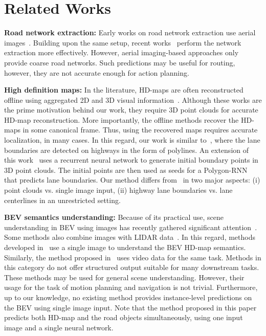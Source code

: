 \documentclass[10pt,twocolumn,letterpaper]{article}
\begin{document}
\section{Related Works}

\noindent\textbf{Road network extraction:} Early works on road network extraction use aerial images~\cite{auclair1999survey, richards1999remote}. Building upon the same setup, recent works~\cite{batra2019improved,sun2019leveraging,ventura2018iterative} perform the network extraction more effectively. However, aerial imaging-based approaches only provide coarse road networks. Such predictions may be useful for routing, however, they are not accurate enough for action planning. 

\noindent\textbf{High definition maps:} In the literature, HD-maps are often reconstructed offline using aggregated 2D and 3D visual information~\cite{liang2019convolutional, homayounfar2018hierarchical,liang2018end}. Although these works are the prime motivation behind our work, they require 3D point clouds for accurate HD-map reconstruction. More importantly, the offline methods recover the HD-maps in some canonical frame. Thus, using the recovered maps requires accurate localization, in many cases. In this regard, our work is similar to~\cite{DBLP:conf/cvpr/HomayounfarMLU18}, where the lane boundaries are detected on highways in the form of polylines. An extension of this work~\cite{DBLP:conf/cvpr/HomayounfarMLU18} uses a recurrent neural network to generate initial boundary points in 3D point clouds. The initial points are then used as seeds for a Polygon-RNN~\cite{DBLP:conf/cvpr/AcunaLKF18} that predicts lane boundaries. Our method differs from~\cite{DBLP:conf/cvpr/HomayounfarMLU18} in two major aspects: (i) point clouds vs. single image input, (ii) highway lane boundaries vs. lane centerlines in an unrestricted setting.

\noindent\textbf{BEV semantics understanding:}
Because of its practical use, scene understanding in BEV using images has recently gathered significant attention~\cite{DBLP:conf/cvpr/RoddickC20,philion2020lift,can2020understanding}. Some methods also combine images with LIDAR data~\cite{pan2020cross,hendy2020fishing}. In this regard, methods developed in~\cite{DBLP:conf/cvpr/RoddickC20,DBLP:journals/corr/abs-2002-08394} use a single image to understand the BEV HD-map semantics. Similarly, the method proposed in~\cite{can2020understanding} uses video data for the same task. Methods in this category do not offer structured output suitable for many downstream tasks. These methods may be used for general scene understanding. However, their usage for the task of motion planning and navigation is not trivial. Furthermore, up to our knowledge, no existing method provides instance-level predictions on the BEV using single image input. Note that the method proposed in this paper predicts both HD-map and the road objects simultaneously, using one input image and a single neural network.   
\end{document}
